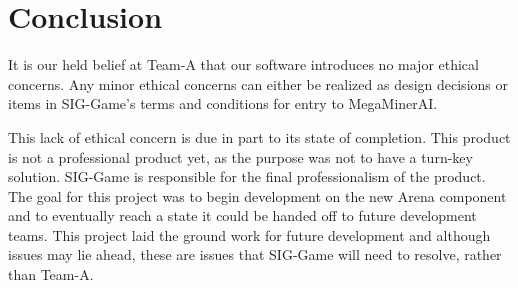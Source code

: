 \documentclass{article}
\begin{document}
\section{Conclusion}
It is our held belief at Team-A that our software introduces no major ethical concerns. Any minor ethical concerns can either be realized as design decisions or items in SIG-Game's terms and conditions for entry to MegaMinerAI.

This lack of ethical concern is due in part to its state of completion. This product is not a professional product yet, as the purpose was not to have a turn-key solution. SIG-Game is responsible for the final professionalism of the product. The goal for this project was to begin development on the new Arena component and to eventually reach a state it could be handed off to future development teams. This project laid the ground work for future development and although issues may lie ahead, these are issues that SIG-Game will need to resolve, rather than Team-A.
\end{document}

